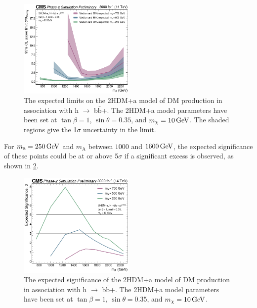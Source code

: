 \begin{figure}[ht]
\centering
\includegraphics[width=0.5\textwidth]{Chapters/Results/lim_scan.png}
\caption{The expected limits on the 2HDM+a model of DM production in association with h $\to$ b$\bar{\mathrm{b}}$+\ptmiss. The 2HDM+a model parameters have been set at $\tan\beta = 1$, $\sin\theta = 0.35$, and $m_\chi= \GeV{10}$. The shaded regions give the 1$\sigma$ uncertainty in the limit.}
\label{fig:limits}
\end{figure}

For $m_\mathrm{a} = \GeV{250}$ and $m_\mathrm{A}$ between $1000$ and $\GeV{1600}$, the expected significance of these points could be at or above 5$\sigma$ if a significant excess is observed, as shown in \cref{fig:sig}.

\begin{figure}[ht]
\centering
\includegraphics[width=0.5\textwidth]{Chapters/Results/sig_scan.png}
\caption{The expected significance of the 2HDM+a model of DM production in association with h $\to$ b$\bar{\mathrm{b}}$+\ptmiss. The 2HDM+a model parameters have been set at $\tan\beta = 1$, $\sin\theta = 0.35$, and $m_\chi= \GeV{10}$.}
\label{fig:sig}
\end{figure}

